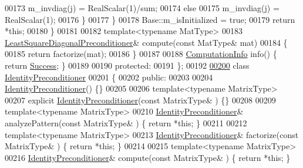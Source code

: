 \begin{DoxyCode}
00173             m\_invdiag(j) = RealScalar(1)/sum;
00174           \textcolor{keywordflow}{else}
00175             m\_invdiag(j) = RealScalar(1);
00176         \}
00177       \}
00178       Base::m\_isInitialized = \textcolor{keyword}{true};
00179       \textcolor{keywordflow}{return} *\textcolor{keyword}{this};
00180     \}
00181     
00182     \textcolor{keyword}{template}<\textcolor{keyword}{typename} MatType>
00183     \hyperlink{group___iterative_linear_solvers___module_class_eigen_1_1_least_square_diagonal_preconditioner}{LeastSquareDiagonalPreconditioner}& compute(\textcolor{keyword}{const} MatType& mat)
00184     \{
00185       \textcolor{keywordflow}{return} factorize(mat);
00186     \}
00187     
00188     \hyperlink{group__enums_ga85fad7b87587764e5cf6b513a9e0ee5e}{ComputationInfo} info() \{ \textcolor{keywordflow}{return} \hyperlink{group__enums_gga85fad7b87587764e5cf6b513a9e0ee5ea52581b035f4b59c203b8ff999ef5fcea}{Success}; \}
00189 
00190   \textcolor{keyword}{protected}:
00191 \};
00192 
\hyperlink{group___iterative_linear_solvers___module}{00200} \textcolor{keyword}{class }\hyperlink{group___iterative_linear_solvers___module_class_eigen_1_1_identity_preconditioner}{IdentityPreconditioner}
00201 \{
00202   \textcolor{keyword}{public}:
00203 
00204     \hyperlink{group___iterative_linear_solvers___module_class_eigen_1_1_identity_preconditioner}{IdentityPreconditioner}() \{\}
00205 
00206     \textcolor{keyword}{template}<\textcolor{keyword}{typename} MatrixType>
00207     \textcolor{keyword}{explicit} \hyperlink{group___iterative_linear_solvers___module_class_eigen_1_1_identity_preconditioner}{IdentityPreconditioner}(\textcolor{keyword}{const} MatrixType& ) \{\}
00208     
00209     \textcolor{keyword}{template}<\textcolor{keyword}{typename} MatrixType>
00210     \hyperlink{group___iterative_linear_solvers___module_class_eigen_1_1_identity_preconditioner}{IdentityPreconditioner}& analyzePattern(\textcolor{keyword}{const} MatrixType& ) \{ \textcolor{keywordflow}{return} *\textcolor{keyword}{this}; \}
00211     
00212     \textcolor{keyword}{template}<\textcolor{keyword}{typename} MatrixType>
00213     \hyperlink{group___iterative_linear_solvers___module_class_eigen_1_1_identity_preconditioner}{IdentityPreconditioner}& factorize(\textcolor{keyword}{const} MatrixType& ) \{ \textcolor{keywordflow}{return} *\textcolor{keyword}{this}; \}
00214 
00215     \textcolor{keyword}{template}<\textcolor{keyword}{typename} MatrixType>
00216     \hyperlink{group___iterative_linear_solvers___module_class_eigen_1_1_identity_preconditioner}{IdentityPreconditioner}& compute(\textcolor{keyword}{const} MatrixType& ) \{ \textcolor{keywordflow}{return} *\textcolor{keyword}{this}; \}

\end{DoxyCode}
